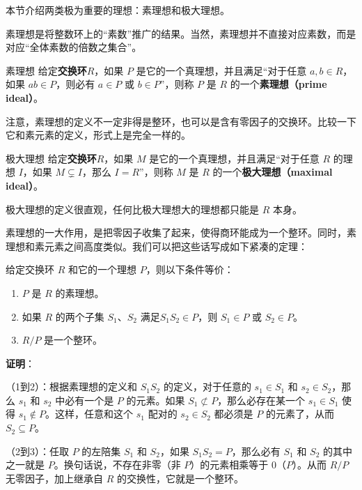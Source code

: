 

本节介绍两类极为重要的理想：素理想和极大理想。


素理想是将整数环上的“素数”推广的结果。当然，素理想并不直接对应素数，而是对应“全体素数的倍数之集合”。


\begin{definition}{素理想}
给定\textbf{交换环}$R$，如果 $P$ 是它的一个真理想，并且满足“对于任意 $a, b\in R$，如果 $ab\in P$，则必有 $a\in P$ 或 $b\in P$”，则称 $P$ 是 $R$ 的一个\textbf{素理想（prime ideal）}。
\end{definition}

注意，素理想的定义不一定非得是整环，也可以是含有零因子的交换环。比较一下它和素元素的定义，形式上是完全一样的。

\begin{definition}{极大理想}
给定\textbf{交换环}$R$，如果 $M$ 是它的一个真理想，并且满足“对于任意 $R$ 的理想 $I$，如果 $M\subsetneq I$，那么 $I=R$”，则称 $M$ 是 $R$ 的一个\textbf{极大理想（maximal ideal）}。
\end{definition}

极大理想的定义很直观，任何比极大理想大的理想都只能是 $R$ 本身。

素理想的一大作用，是把零因子收集了起来，使得商环能成为一个整环。同时，素理想和素元素之间高度类似。我们可以把这些话写成如下紧凑的定理：

\begin{theorem}{}\label{the_Ideals_1}
给定交换环 $R$ 和它的一个理想 $P$，则以下条件等价：
\begin{enumerate}
\item $P$ 是 $R$ 的素理想。
\item 如果 $R$ 的两个子集 $S_1$、$S_2$ 满足$S_1S_2\in P$，则 $S_1\in P$ 或 $S_2\in P$。
\item $R/P$ 是一个整环。
\end{enumerate}
\end{theorem}

\textbf{证明}：

（1到2）：根据素理想的定义和 $S_1S_2$ 的定义，对于任意的 $s_1\in S_1$ 和 $s_2\in S_2$，那么 $s_1$ 和 $s_2$ 中必有一个是 $P$ 的元素。如果 $S_1\not\subset P$，那么必存在某一个 $s_1\in S_1$ 使得 $s_1\not\in P$。这样，任意和这个 $s_1$ 配对的 $s_2\in S_2$ 都必须是 $P$ 的元素了，从而 $S_2\subseteq P$。

（2到3）：任取 $P$ 的左陪集 $S_1$ 和 $S_2$，如果 $S_1S_2=P$，那么必有 $S_1$ 和 $S_2$ 的其中之一就是 $P$。换句话说，不存在非零（非 $P$）的元素相乘等于 $0$（$P$）。从而 $R/P$ 无零因子，加上继承自 $R$ 的交换性，它就是一个整环。

